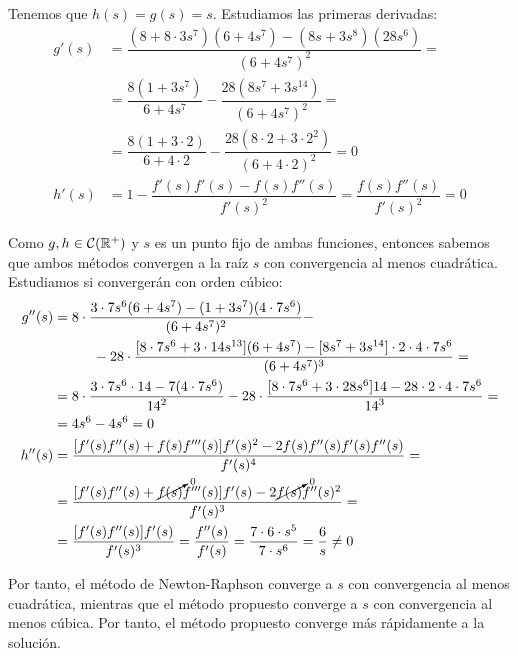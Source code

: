 \begin{ejercicio}
\begin{enumerate}
        Tenemos que $h(s)=g(s)=s$. Estudiamos las primeras derivadas:
        \begin{align*}
            g'(s) &= \dfrac{(8+8\cdot 3s^7)(6+4s^7) - (8s+3s^8)(28s^6)}{(6+4s^7)^2}
            =\\&= \dfrac{8(1+3s^7)}{6+4s^7} - \dfrac{28\left(8s^7+3s^{14}\right)}{(6+4s^7)^2}
            =\\&= \dfrac{8(1+3\cdot 2)}{6+4\cdot 2} - \dfrac{28\left(8\cdot 2+3\cdot 2^2\right)}{(6+4\cdot 2)^2}=0\\
            h'(s) &= 1 - \dfrac{f'(s)f'(s) - f(s)f''(s)}{f'(s)^2} = \dfrac{f(s)f''(s)}{f'(s)^2} = 0
        \end{align*}

        Como $g,h\in \mathcal{C}(\mathbb{R}^+)$ y $s$ es un punto fijo de ambas funciones, entonces sabemos que ambos métodos convergen a la raíz $s$ con convergencia al menos cuadrática. Estudiamos si convergerán con orden cúbico:
        \begin{align*}
            g''(s) &= 8\cdot \dfrac{3\cdot 7s^6(6+4s^7) - (1+3s^7)(4\cdot 7s^6)}{(6+4s^7)^2} -\\&\hspace{1cm}- 28\cdot \dfrac{[8\cdot 7s^6+3\cdot 14s^{13}](6+4s^7)-[8s^7+3s^{14}]\cdot 2\cdot 4\cdot 7s^6}{(6+4s^7)^3}
            =\\&= 8\cdot \dfrac{3\cdot 7s^6\cdot 14 - 7(4\cdot 7s^6)}{{14}^2} - 28\cdot \dfrac{[8\cdot 7s^6+3\cdot 28s^{6}]14-28\cdot 2\cdot 4\cdot 7s^6}{{14}^3}
            =\\&= 4s^6 - 4s^6 = 0\\
            h''(s) &= \dfrac{[f'(s)f''(s)+f(s)f'''(s)]f'(s)^2 - 2f(s)f''(s)f'(s)f''(s)}{f'(s)^4}
            =\\&= \dfrac{[f'(s)f''(s)+\cancelto{0}{f(s)}f'''(s)]f'(s) - 2\cancelto{0}{f(s)}f''(s)^2}{f'(s)^3}
            =\\&= \dfrac{[f'(s)f''(s)]f'(s)}{f'(s)^3} = \dfrac{f''(s)}{f'(s)} = \dfrac{7\cdot 6\cdot s^5}{7\cdot s^6} = \dfrac{6}{s}\neq 0
        \end{align*}

        Por tanto, el método de Newton-Raphson converge a $s$ con convergencia al menos cuadrática, mientras que el método propuesto converge a $s$ con convergencia al menos cúbica. Por tanto, el método propuesto converge más rápidamente a la solución.
    \end{enumerate}
\end{ejercicio}


